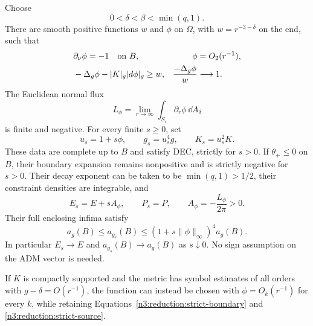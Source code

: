 \begin{lemma}
\label{n3:reduction:strict-direction}
Choose
\[
 0<\delta<\beta<\min(q,1).
\]
There are smooth positive functions $w$ and $\phi$ on $\Omega$, with
$w=r^{-3-\delta}$ on the end, such that
\begin{align}
 &\partial_\nu\phi=-1\quad\hbox{on }B,
       &\phi&=O_2(r^{-1}),\label{n3:reduction:strict-boundary}\\
 &-\Delta_g\phi-|K|_g|d\phi|_g\ge w,
       &\frac{-\Delta_g\phi}{w}&\longrightarrow1.
       \label{n3:reduction:strict-source}
\end{align}
The Euclidean normal flux
\[
 L_\phi=\lim_{r\to\infty}
          \int_{S_r}\partial_r\phi\,\dd A_\delta
\]
is finite and negative.  For every finite $s\ge0$, set
\begin{equation}
 \label{n3:reduction:linear-family}
 u_s=1+s\phi,\qquad g_s=u_s^4g,\qquad K_s=u_s^2K.
\end{equation}
These data are complete up to $B$ and satisfy DEC, strictly for $s>0$.
If $\theta_+\le0$ on $B$, their boundary expansion remains nonpositive
and is strictly negative for $s>0$.  Their decay exponent can be taken to be
$\min(q,1)>1/2$, their constraint densities are integrable, and
\begin{equation}
 \label{n3:reduction:strict-charges}
 E_s=E+sA_\phi,\qquad P_s=P,
 \qquad A_\phi=-\frac{L_\phi}{2\pi}>0.
\end{equation}
Their full enclosing infima satisfy
\begin{equation}
 \label{n3:reduction:strict-areas}
 a_g(B)\le a_{g_s}(B)
       \le (1+s\|\phi\|_\infty)^4a_g(B).
\end{equation}
In particular $E_s\to E$ and $a_{g_s}(B)\to a_g(B)$ as $s\downarrow0$.
No sign assumption on the ADM vector is needed.

If $K$ is compactly supported and the metric has symbol estimates of all
orders with $g-\delta=O(r^{-1})$, the function can instead be chosen with
$\phi=O_k(r^{-1})$ for every $k$, while retaining
Equations~\eqref{n3:reduction:strict-boundary} and
\eqref{n3:reduction:strict-source}.
\end{lemma}

